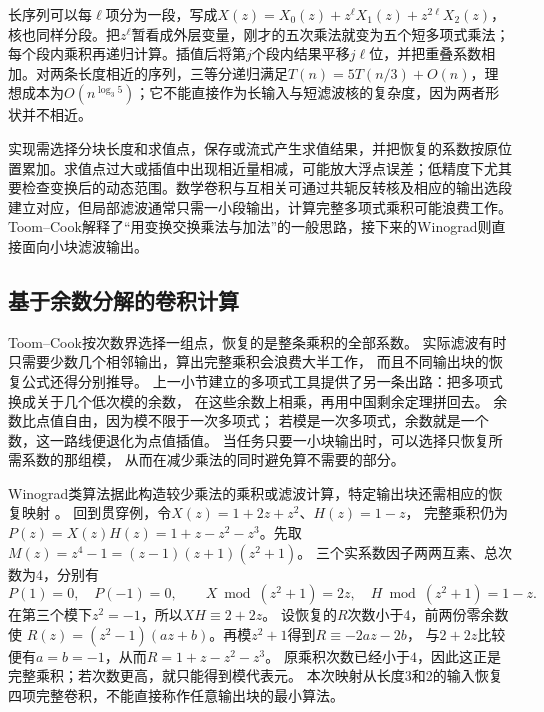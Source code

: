 长序列可以每$\ell$项分为一段，写成$X(z)=X_0(z)+z^\ell X_1(z)+z^{2\ell}X_2(z)$，核也同样分段。把$z^\ell$暂看成外层变量，刚才的五次乘法就变为五个短多项式乘法；每个段内乘积再递归计算。插值后将第$j$个段内结果平移$j\ell$位，并把重叠系数相加。对两条长度相近的序列，三等分递归满足$T(n)=5T(n/3)+O(n)$，理想成本为$O(n^{\log_3 5})$；它不能直接作为长输入与短滤波核的复杂度，因为两者形状并不相近。

实现需选择分块长度和求值点，保存或流式产生求值结果，并把恢复的系数按原位置累加。求值点过大或插值中出现相近量相减，可能放大浮点误差；低精度下尤其要检查变换后的动态范围。数学卷积与互相关可通过共轭反转核及相应的输出选段建立对应，但局部滤波通常只需一小段输出，计算完整多项式乘积可能浪费工作。Toom--Cook解释了“用变换交换乘法与加法”的一般思路，接下来的Winograd则直接面向小块滤波输出。

\subsection{基于余数分解的卷积计算}\label{sec:signal-analysis-fast-winograd}\label{sec:cnn-winograd}

Toom--Cook按次数界选择一组点，恢复的是整条乘积的全部系数。
实际滤波有时只需要少数几个相邻输出，算出完整乘积会浪费大半工作，
而且不同输出块的恢复公式还得分别推导。
上一小节建立的多项式工具提供了另一条出路：把多项式换成关于几个低次模的余数，
在这些余数上相乘，再用中国剩余定理拼回去。
余数比点值自由，因为模不限于一次多项式；
若模是一次多项式，余数就是一个数，这一路线便退化为点值插值。
当任务只要一小块输出时，可以选择只恢复所需系数的那组模，
从而在减少乘法的同时避免算不需要的部分。

Winograd类算法据此构造较少乘法的乘积或滤波计算，特定输出块还需相应的恢复映射
。
回到贯穿例，令$X(z)=1+2z+z^2$、$H(z)=1-z$，
完整乘积仍为$P(z)=X(z)H(z)=1+z-z^2-z^3$。先取
$M(z)=z^4-1=(z-1)(z+1)(z^2+1)$。
三个实系数因子两两互素、总次数为$4$，分别有
\[
  P(1)=0,\quad P(-1)=0,\qquad
  X\bmod(z^2+1)=2z,\quad H\bmod(z^2+1)=1-z.
\]
在第三个模下$z^2=-1$，所以$XH\equiv2+2z$。
设恢复的$R$次数小于$4$，前两份零余数使
$R(z)=(z^2-1)(az+b)$。再模$z^2+1$得到$R\equiv-2az-2b$，
与$2+2z$比较便有$a=b=-1$，从而$R=1+z-z^2-z^3$。
原乘积次数已经小于$4$，因此这正是完整乘积；若次数更高，就只能得到模代表元。
本次映射从长度$3$和$2$的输入恢复四项完整卷积，不能直接称作任意输出块的最小算法。

